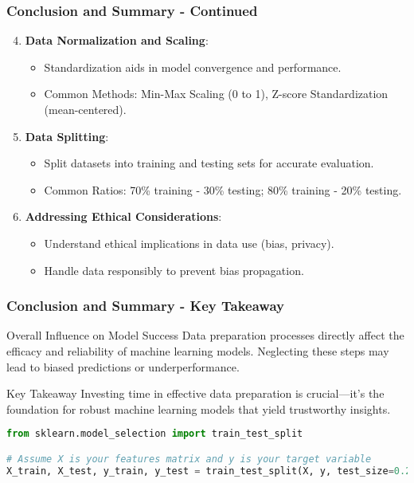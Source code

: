 \documentclass[aspectratio=169]{beamer}
\begin{document}
\begin{frame}[fragile]
    \frametitle{Conclusion and Summary - Continued}
    \begin{enumerate}
        \setcounter{enumi}{3}
        
        \item \textbf{Data Normalization and Scaling}:
        \begin{itemize}
            \item Standardization aids in model convergence and performance.
            \item Common Methods: Min-Max Scaling (0 to 1), Z-score Standardization (mean-centered).
        \end{itemize}
        
        \item \textbf{Data Splitting}:
        \begin{itemize}
            \item Split datasets into training and testing sets for accurate evaluation.
            \item Common Ratios: 70\% training - 30\% testing; 80\% training - 20\% testing.
        \end{itemize}

        \item \textbf{Addressing Ethical Considerations}:
        \begin{itemize}
            \item Understand ethical implications in data use (bias, privacy).
            \item Handle data responsibly to prevent bias propagation.
        \end{itemize}
    \end{enumerate}
\end{frame}

\begin{frame}[fragile]
    \frametitle{Conclusion and Summary - Key Takeaway}
    \begin{block}{Overall Influence on Model Success}
        Data preparation processes directly affect the efficacy and reliability of machine learning models. Neglecting these steps may lead to biased predictions or underperformance.
    \end{block}
    
    \vspace{0.5cm}
    
    \begin{block}{Key Takeaway}
        Investing time in effective data preparation is crucial—it's the foundation for robust machine learning models that yield trustworthy insights.
    \end{block}
    
    \begin{lstlisting}[language=Python, caption={Code Snippet for Data Splitting in Python}]
from sklearn.model_selection import train_test_split

# Assume X is your features matrix and y is your target variable
X_train, X_test, y_train, y_test = train_test_split(X, y, test_size=0.2, random_state=42)
    \end{lstlisting}
\end{frame}
\end{document}
